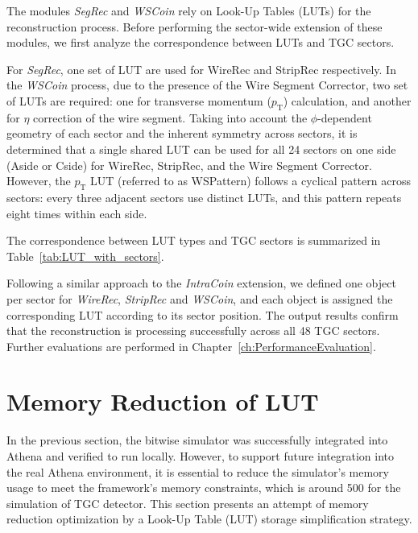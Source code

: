 The modules \textit{SegRec} and \textit{WSCoin} rely on Look-Up Tables (LUTs) for the reconstruction process. Before performing the sector-wide extension of these modules, we first analyze the correspondence between LUTs and TGC sectors.

For \textit{SegRec}, one set of LUT are used for WireRec and StripRec respectively. In the \textit{WSCoin} process, due to the presence of the Wire Segment Corrector, two set of LUTs are required: one for transverse momentum ($p_\mathrm{T}$) calculation, and another for $\eta$ correction of the wire segment. Taking into account the $\phi$-dependent geometry of each sector and the inherent symmetry across sectors, it is determined that a single shared LUT can be used for all 24 sectors on one side (Aside or Cside) for WireRec, StripRec, and the Wire Segment Corrector. However, the $p_\mathrm{T}$ LUT (referred to as WSPattern) follows a cyclical pattern across sectors: every three adjacent sectors use distinct LUTs, and this pattern repeats eight times within each side.

The correspondence between LUT types and TGC sectors is summarized in Table~\ref{tab:LUT_with_sectors}.


Following a similar approach to the \textit{IntraCoin} extension, we defined one object per sector for \textit{WireRec}, \textit{StripRec} and \textit{WSCoin}, and each object is assigned the corresponding LUT according to its sector position. The output results confirm that the reconstruction is processing successfully across all 48 TGC sectors. Further evaluations are performed in Chapter~\ref{ch:PerformanceEvaluation}.
\section{Memory Reduction of LUT} \label{MemoryReduction}
In the previous section, the bitwise simulator was successfully integrated into Athena and verified to run locally. However, to support future integration into the real Athena environment, it is essential to reduce the simulator's memory usage to meet the framework’s memory constraints, which is around 500  for the simulation of TGC detector. This section presents an attempt of memory reduction optimization by a Look-Up Table (LUT) storage simplification strategy.

